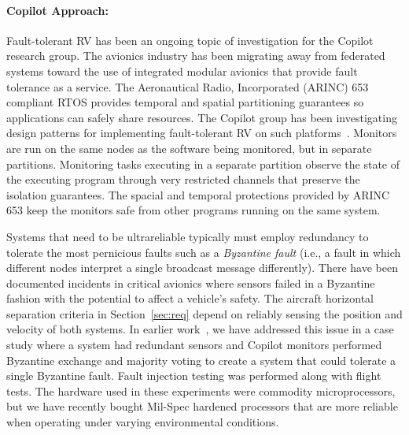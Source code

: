 \paragraph{Copilot Approach:} Fault-tolerant RV has been an ongoing
topic of investigation for the Copilot research group. The avionics
industry has been migrating away from federated systems toward the use
of integrated modular avionics that provide fault tolerance as a
service.  The Aeronautical Radio, Incorporated (ARINC)
653~\cite{ARINC653} compliant RTOS
provides temporal and spatial partitioning guarantees so applications
can safely share resources.  The Copilot group has been investigating
design patterns for implementing fault-tolerant RV on such
platforms~\cite{Kaveh15}. Monitors are run on the same nodes as the
software being monitored, but in separate partitions. Monitoring tasks
executing in a separate partition observe the state of the executing
program through very restricted
channels that preserve the isolation guarantees.  The spacial and
temporal protections provided by ARINC 653 keep the monitors safe from
other programs running on the same system.

Systems that need to  be ultrareliable typically must employ redundancy to
tolerate the most pernicious faults such as a \emph{Byzantine fault}
(i.e., a fault in which different nodes interpret a single broadcast
message differently).  There  have been  documented incidents in
critical avionics  where sensors failed in a Byzantine fashion with
the potential to affect a vehicle's safety.  The aircraft horizontal separation criteria in
Section~\ref{sec:req} depend on reliably sensing the position and
velocity of both systems. In earlier work~\cite{pike-isse-13}, we have
 addressed this issue in a case study where a system had
redundant sensors and Copilot monitors performed Byzantine exchange and 
majority voting to create a system that could tolerate a single
Byzantine fault.  Fault injection testing was
performed along with flight tests.  The hardware used in these
experiments were commodity microprocessors, but we have recently
bought Mil-Spec hardened processors that are more reliable when operating
under varying environmental conditions.






